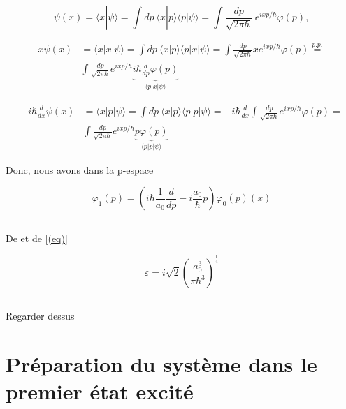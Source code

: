 \documentclass[a4paper,12pt]{article}
\begin{document}
\begin{equation}
	{\displaystyle \psi (x)=\langle x|\psi \rangle =\int \!\!dp~\langle x|p\rangle \langle p|\psi \rangle =\int \!\!\frac{dp}{{\sqrt {2\pi \hbar }}}~{e^{ixp/\hbar }{{\varphi }}(p)},}
\end{equation}

\begin{equation}
	\begin{aligned}
	\displaystyle x\psi (x)&=\langle x|x|\psi \rangle =\int \!\!dp~\langle x|p\rangle \langle p|x|\psi \rangle =\int \!\!\frac{dp}{{\sqrt {2\pi \hbar }}}x{e^{ixp/\hbar }{{\varphi }}(p)} \overset{p.p.}{=} \\ 
	&\int \!\!\frac{dp}{{\sqrt {2\pi \hbar }}}{e^{ixp/\hbar }\underbrace{i\hbar\frac{d}{dp}\varphi(p)}_{\langle p|x|\psi \rangle}} 
\end{aligned}
\end{equation}

\begin{equation}
	\begin{aligned}
		\displaystyle -i\hbar\frac{d}{dx}\psi (x)&=\langle x|p|\psi \rangle =\int \!\!dp~\langle x|p\rangle \langle p|p|\psi \rangle =-i\hbar\frac{d}{dx}\int \!\!\frac{dp}{{\sqrt {2\pi \hbar }}}{e^{ixp/\hbar }{{\varphi }}(p)} {=} \\ 
		&\int \!\!\frac{dp}{{\sqrt {2\pi \hbar }}}{e^{ixp/\hbar }\underbrace{p\varphi(p)}_{\langle p|p|\psi \rangle}} 
	\end{aligned}
\end{equation}

Donc, nous avons dans la p-espace

\begin{equation}\label{eq}
		\varphi_1(p){=} \left( i\hbar\frac1{a_0}\frac{d}{dp} - i \frac{a_0} {\hbar}p \right)\varphi_0(p)(x) 
\end{equation}

\subsection{}

De et de \ref{(eq)}

\begin{equation}\label{key}
	\varepsilon = i\sqrt 2\left(\frac{a^3_0}{\pi\hbar^3}\right)^{\frac14}
\end{equation}

\subsection{}

Regarder dessus 

\section{Préparation du système dans le premier état excité}

\subsection{}
\end{document}
